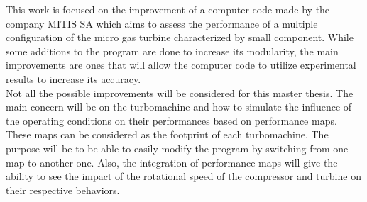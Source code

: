 This work is focused on the improvement of a computer code made by the company MITIS SA which aims to assess the performance of a multiple configuration of the micro gas turbine characterized by small component. While some additions to the program are done to increase its modularity, the main improvements are ones that will allow the computer code to utilize experimental results to increase its accuracy. \\

Not all the possible improvements will be considered for this master thesis. The main concern will be on the turbomachine and how to simulate the influence of the operating conditions on their performances based on performance maps. These maps can be considered as the footprint of each turbomachine.  The purpose will be to be able to easily modify the program by switching from one map to another one. Also, the integration of performance maps will give the ability to see the impact of the rotational speed of the compressor and turbine on their respective behaviors.


